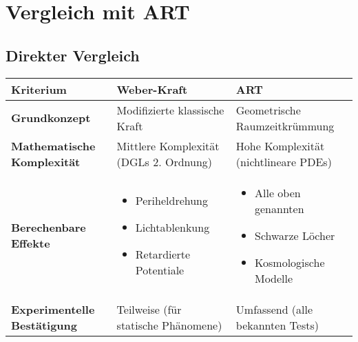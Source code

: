 \documentclass{article}
\begin{document}
\section{Vergleich mit ART}
\subsection*{Direkter Vergleich}
\begin{table}[H]
    \centering
    \begin{tabular}{lp{4cm}p{4cm}}
        \toprule
        Kriterium & Weber-Kraft & ART \\
        \midrule
        \textbf{Grundkonzept} & Modifizierte klassische Kraft & Geometrische Raumzeitkrümmung \\
        \textbf{Mathematische Komplexität} & Mittlere Komplexität (DGLs 2. Ordnung) & Hohe Komplexität (nichtlineare PDEs) \\
        \textbf{Berechenbare Effekte} & 
        \begin{itemize}
            \item Periheldrehung
            \item Lichtablenkung
            \item Retardierte Potentiale
        \end{itemize} &
        \begin{itemize}
            \item Alle oben genannten
            \item Schwarze Löcher
            \item Kosmologische Modelle
        \end{itemize} \\
        \textbf{Experimentelle Bestätigung} & Teilweise (für statische Phänomene) & Umfassend (alle bekannten Tests) \\
        \bottomrule
    \end{tabular}
\end{table}

\begin{center}
\end{center}
\end{document}
